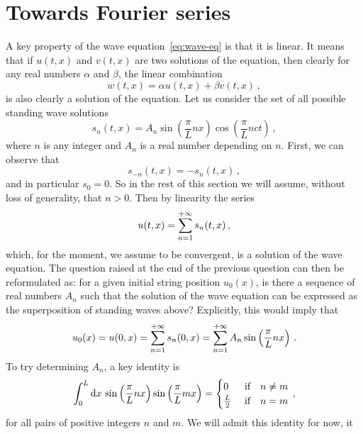 \section{Towards Fourier series}
\label{sec:toward-fourier}
A key property of the wave equation~\cref{eq:wave-eq} is that it is linear. It means that
if $u(t,x)$ and $v(t,x)$ are two solutions of the equation, then clearly for any real
numbers $\alpha$ and $\beta$, the linear combination
\begin{equation}
  w(t,x)=\alpha u(t,x)+\beta v(t,x)\,,
\end{equation}
is also clearly a solution of the equation. Let us consider the set of all possible
standing wave solutions
\begin{equation}
  s_n(t,x)=A_n\sin\left(\frac{\pi}{L}nx\right)\cos\left(\frac{\pi}{L}nct\right)\,,
\end{equation}
where $n$ is any integer and $A_n$ is a real number depending on $n$. First, we can
observe that
\begin{equation}
  s_{-n}(t,x)=-s_n(t,x)\,,
\end{equation}
and in particular $s_0=0$. So in the rest of this section we will assume, without loss of
generality, that $n>0$. Then by linearity the series
\begin{equation}
  u(t,x)=\sum_{n=1}^{+\infty}s_n(t,x)\,,
\end{equation}
which, for the moment, we assume to be convergent, is a solution of the wave equation. The
question raised at the end of the previous question can then be reformulated as: for a
given initial string position $u_0(x)$, is there a sequence of real numbers $A_n$ such
that the solution of the wave equation can be expressed as the superposition of standing
waves above? Explicitly, this would imply that
\begin{equation}
  \label{eq:string-ic-fourier}
  u_0(x)=u(0,x)=\sum_{n=1}^{+\infty}s_n(0,x)=\sum_{n=1}^{+\infty}A_n\sin\left(\frac{\pi}{L}nx\right)\,.
\end{equation}
To try determining $A_n$, a key identity is
\begin{equation}
  \int_{0}^{L}\mathrm{d} x\,\sin\left(\frac{\pi}{L}nx\right)\sin\left(\frac{\pi}{L}mx\right)
  =
  \begin{cases}
    0&~\text{if}\quad n\neq m\\
    \frac{L}{2}&~\text{if}\quad n=m
  \end{cases}
  \,,
\end{equation}
for all pairs of positive integers $n$ and $m$. We will admit this identity for now, it

